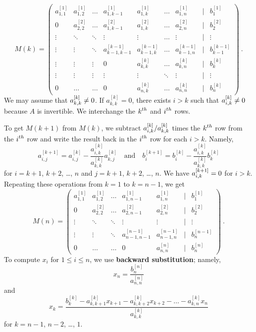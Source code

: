 \[
M(k) = \begin{pmatrix}
a^{[1]}_{1,1} & a^{[1]}_{1,2} & \dots & a^{[1]}_{1,k-1} & a^{[1]}_{1,k} & \ldots &
a^{[1]}_{1,n} & | & b^{[1]}_1 \\
0 & a^{[2]}_{2,2} & \ldots  & a^{[2]}_{1,k-1} & a^{[2]}_{1,k} &
\ldots & a^{[2]}_{2,n} & | & b^{[2]}_2\\
\vdots & \ddots & \ddots & \vdots & \vdots & \ldots & \vdots & | & \vdots \\
\vdots & \vdots & \ddots & a^{[k-1]}_{k-1,k-1} & a^{[k-1]}_{k-1,k} & \ldots &
a^{[k-1]}_{k-1,n} & | & b^{[k-1]}_{k-1}\\
\vdots & \vdots & \vdots & 0 & a^{[k]}_{k,k} & \ldots & a^{[k]}_{k,n}
& | & b^{[k]}_k\\
\vdots & \vdots & \vdots & \vdots & \vdots & \ddots & \vdots & | & \vdots \\
0 & \ldots & \ldots & 0 & a^{[k]}_{n,k} & \ldots & a^{[k]}_{n,n} & | & b^{[k]}_n
\end{pmatrix}  \ .
\]
We may assume that
$\displaystyle a^{[k]}_{k,k}\not=0$.  If $a^{[k]}_{k,k} = 0$, there
exists $i>k$ such that $\displaystyle a^{[k]}_{i,k}\not=0$ because $A$
is invertible.  We interchange the $\displaystyle k^{th}$ and
$\displaystyle i^{th}$ rows.

To get $M(k+1)$ from $M(k)$, we subtract
$\displaystyle a^{[k]}_{i,k}/a^{[k]}_{k,k}$ times the
$\displaystyle k^{th}$ row from the $\displaystyle i^{th}$ row
and write the result back in the $\displaystyle i^{th}$ row for each
$i > k$.  Namely,
\begin{equation} \label{iminusk}
a^{[k+1]}_{i,j} = a^{[k]}_{i,j} - \frac{a^{[k]}_{i,k}}{a^{[k]}_{k,k}} a^{[k]}_{k,j}
\quad \text{and} \quad
b^{[k+1]}_i = b^{[k]}_i - \frac{a^{[k]}_{i,k}}{a^{[k]}_{k,k}} b^{[k]}_k
\end{equation}
for $i=k+1$, $k+2$, \ldots, $n$ and $j=k+1$, $k+2$, \ldots, $n$.
We have $\displaystyle a^{[k+1]}_{i,k} = 0$ for $i>k$.  Repeating
these operations from $k=1$ to $k=n-1$, we get
\[
M(n) = \begin{pmatrix}
a^{[1]}_{1,1} & a^{[1]}_{1,2} & \dots & a^{[1]}_{1,n-1} &
a^{[1]}_{1,n} & | & b^{[1]}_1 \\
0 & a^{[2]}_{2,2} & \ldots & a^{[2]}_{2,n-1} & a^{[2]}_{2,n} & | & b^{[2]}_2\\
\vdots & \ddots & \ddots & \vdots & \vdots & | & \vdots \\
\vdots & \vdots & \ddots & a^{[n-1]}_{n-1,n-1} & a^{[n-1]}_{n-1,n} & |
& b^{[n-1]}_n \\
0 & \ldots & \ldots & 0 & a^{[n]}_{n,n} & | & b^{[n]}_n
\end{pmatrix}  \ .
\]
To compute $x_i$ for $1\leq i \leq n$, we use
{\bfseries backward substitution}; namely,
\[
x_n = \frac{b^{[n]}_n}{a^{[n]}_{n,n}}
\]
and
\begin{equation} \label{backsubst}
x_{k} = \frac{b^{[k]}_k - a^{[k]}_{k,k+1} x_{k+1} - a^{[k]}_{k,k+2}
  x_{k+2} - \ldots  - a^{[k]}_{k,n} x_n}{a^{[k]}_{k,k}}
\end{equation}
for $k=n-1$, $n-2$, \ldots, $1$.

